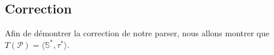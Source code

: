 
\subsection{Correction}
Afin de démontrer la correction de notre parser, nous allons montrer que $T(\mathcal{P}) = \langle \mathds{S}^*, \tau^* \rangle$.

